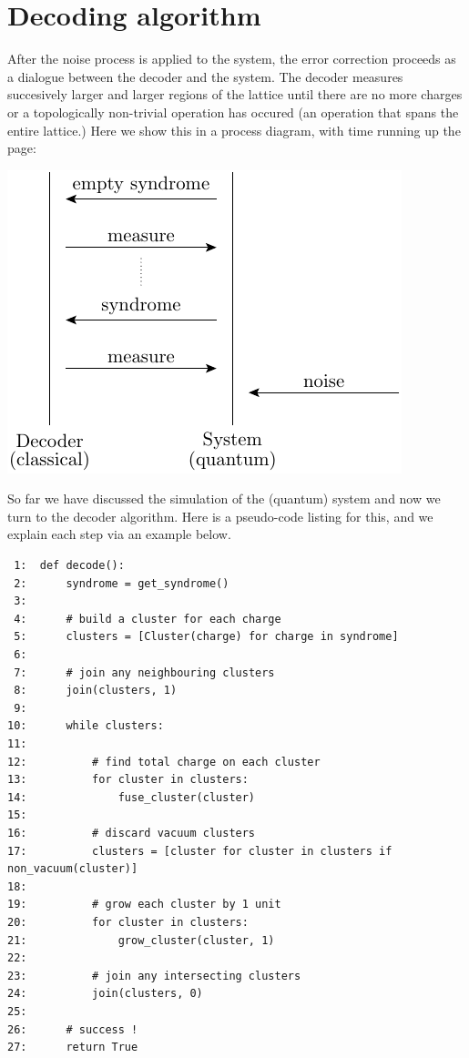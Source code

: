 \documentclass[aps, prl, letterpaper, twocolumn, superscriptaddress, notitlepage, 10pt]{revtex4-1}
\begin{document}
%
%

\section{Decoding algorithm}

After the noise process is applied to the system,
the error correction proceeds as a dialogue between the
decoder and the system. 
The decoder measures succesively larger and larger
regions of the lattice
until there are no more charges 
or a topologically non-trivial operation has occured
(an operation that spans the entire lattice.)
Here we show this in a process diagram, with time running up
the page:
\begin{center}
\includegraphics[]{pic-process.pdf}
\end{center}

So far we have discussed the simulation of the (quantum) system
and now we turn to the decoder algorithm.
Here is a pseudo-code listing for this,
and we explain each step via an example below.

\begin{verbatim}
 1:  def decode():
 2:      syndrome = get_syndrome()
 3:      
 4:      # build a cluster for each charge
 5:      clusters = [Cluster(charge) for charge in syndrome]
 6:  
 7:      # join any neighbouring clusters
 8:      join(clusters, 1)
 9:      
10:      while clusters:
11:      
12:          # find total charge on each cluster
13:          for cluster in clusters:
14:              fuse_cluster(cluster)
15:      
16:          # discard vacuum clusters
17:          clusters = [cluster for cluster in clusters if non_vacuum(cluster)]
18:      
19:          # grow each cluster by 1 unit
20:          for cluster in clusters:
21:              grow_cluster(cluster, 1)
22:      
23:          # join any intersecting clusters
24:          join(clusters, 0)
25:  
26:      # success !
27:      return True
\end{verbatim} %
\end{document}
